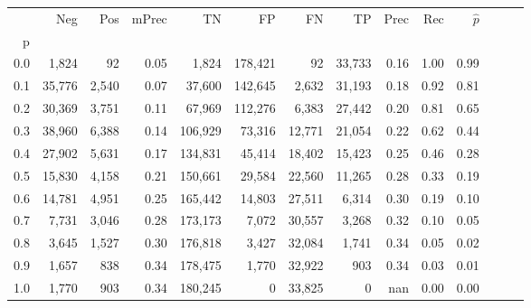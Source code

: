 \begin{tabular}{rrrrrrrrrrrrrr}
\toprule
{} &     Neg &    Pos & mPrec &       TN &       FP &      FN &      TP &  Prec &   Rec & $\hat{p}$ \\
p   &         &        &       &          &          &         &         &       &       &           \\
\midrule
0.0 &   1,824 &     92 &  0.05 &    1,824 &  178,421 &      92 &  33,733 &  0.16 &  1.00 &      0.99 \\
0.1 &  35,776 &  2,540 &  0.07 &   37,600 &  142,645 &   2,632 &  31,193 &  0.18 &  0.92 &      0.81 \\
0.2 &  30,369 &  3,751 &  0.11 &   67,969 &  112,276 &   6,383 &  27,442 &  0.20 &  0.81 &      0.65 \\
0.3 &  38,960 &  6,388 &  0.14 &  106,929 &   73,316 &  12,771 &  21,054 &  0.22 &  0.62 &      0.44 \\
0.4 &  27,902 &  5,631 &  0.17 &  134,831 &   45,414 &  18,402 &  15,423 &  0.25 &  0.46 &      0.28 \\
0.5 &  15,830 &  4,158 &  0.21 &  150,661 &   29,584 &  22,560 &  11,265 &  0.28 &  0.33 &      0.19 \\
0.6 &  14,781 &  4,951 &  0.25 &  165,442 &   14,803 &  27,511 &   6,314 &  0.30 &  0.19 &      0.10 \\
0.7 &   7,731 &  3,046 &  0.28 &  173,173 &    7,072 &  30,557 &   3,268 &  0.32 &  0.10 &      0.05 \\
0.8 &   3,645 &  1,527 &  0.30 &  176,818 &    3,427 &  32,084 &   1,741 &  0.34 &  0.05 &      0.02 \\
0.9 &   1,657 &    838 &  0.34 &  178,475 &    1,770 &  32,922 &     903 &  0.34 &  0.03 &      0.01 \\
1.0 &   1,770 &    903 &  0.34 &  180,245 &        0 &  33,825 &       0 &   nan &  0.00 &      0.00 \\
\bottomrule
\end{tabular}
